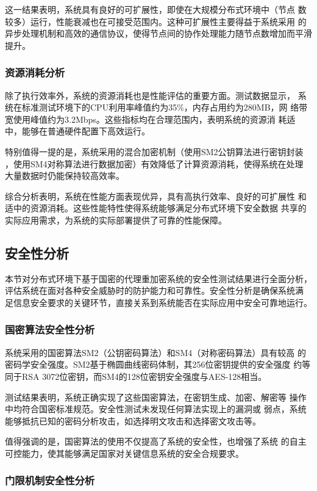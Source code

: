 这一结果表明，系统具有良好的可扩展性，即使在大规模分布式环境中（节点
数较多）运行，性能衰减也在可接受范围内。这种可扩展性主要得益于系统采用
的异步处理机制和高效的通信协议，使得节点间的协作处理能力随节点数增加而平滑提升。

\subsubsection{资源消耗分析}

除了执行效率外，系统的资源消耗也是性能评估的重要方面。测试数据显示，
系统在标准测试环境下的CPU利用率峰值约为35\%，内存占用约为280MB，网
络带宽使用峰值约为3.2Mbps。这些指标均在合理范围内，表明系统的资源消
耗适中，能够在普通硬件配置下高效运行。

特别值得一提的是，系统采用的混合加密机制（使用SM2公钥算法进行密钥封装
，使用SM4对称算法进行数据加密）有效降低了计算资源消耗，使得系统在处理
大量数据时仍能保持较高效率。

综合分析表明，系统在性能方面表现优异，具有高执行效率、良好的可扩展性
和适中的资源消耗。这些性能特性使得系统能够满足分布式环境下安全数据
共享的实际应用需求，为系统的实际部署提供了可靠的性能保障。

\subsection{安全性分析}

本节对分布式环境下基于国密的代理重加密系统的安全性测试结果进行全面分析，
评估系统在面对各种安全威胁时的防护能力和可靠性。安全性分析是确保系统满
足信息安全要求的关键环节，直接关系到系统能否在实际应用中安全可靠地运行。

\subsubsection{国密算法安全性分析}

系统采用的国密算法SM2（公钥密码算法）和SM4（对称密码算法）具有较高
的密码学安全强度。SM2基于椭圆曲线密码体制，其256位密钥提供的安全强度
约等同于RSA 3072位密钥，而SM4的128位密钥安全强度与AES-128相当。

测试结果表明，系统正确实现了这些国密算法，在密钥生成、加密、解密等
操作中均符合国密标准规范。安全性测试未发现任何算法实现上的漏洞或
弱点，系统能够抵抗已知的密码分析攻击，如选择明文攻击和选择密文攻击等。

值得强调的是，国密算法的使用不仅提高了系统的安全性，也增强了系统
的自主可控能力，使其能够满足国家对关键信息系统的安全合规要求。

\subsubsection{门限机制安全性分析}


